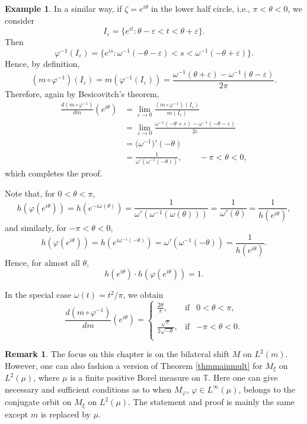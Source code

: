 \documentclass{dis}
\theoremstyle{plain}
\theoremstyle{definition}
\newtheorem{Example}[equation]{Example}
\newtheorem{Remark}[equation]{Remark}
\def\T{\mathbb{T}}
\renewcommand{\phi}{\varphi}
\newcommand{\0}{{\color{lightgray}0}}
\begin{document}
\begin{Example}
In a similar way, if $\zeta = e^{i\theta}$ in the lower half circle, i.e., $\pi<\theta<0$, we consider
\[
I_\varepsilon = \{ e^{it} : \theta-\varepsilon < t < \theta+\varepsilon \}.
\]
Then
\[
\varphi^{-1}(I_\varepsilon) = \{ e^{is} : \omega^{-1}(-\theta-\varepsilon) < s < \omega^{-1}(-\theta+\varepsilon) \}.
\]
Hence, by definition,
\[
(m \circ \varphi^{-1})(I_\varepsilon) = m(\varphi^{-1}(I_\varepsilon)) = \frac{\omega^{-1}(\theta+\varepsilon)-\omega^{-1}(\theta-\varepsilon)}{2\pi}.
\]
Therefore, again by Besicovitch's theorem, 
\begin{align*}
\frac{d(m \circ \varphi^{-1})}{dm}(e^{i\theta}) &= \lim_{\varepsilon \to 0} \frac{(m \circ \varphi^{-1})(I_\varepsilon) }{m(I_\varepsilon)}\\
&= \lim_{\varepsilon \to 0} \frac{\omega^{-1}(-\theta+\varepsilon)-\omega^{-1}(-\theta-\varepsilon)}{2\varepsilon}\\
&= \big(\omega^{-1}\big)'(-\theta)\\
& = \frac{1}{\omega'(\omega^{-1}(-\theta))}, \qquad -\pi < \theta < 0,
\end{align*}
which completes the proof. 

Note that, for $0<\theta<\pi$,
\[
h(\varphi(e^{i\theta})) = h(e^{-i\omega(\theta)}) = \frac{1}{\omega'(\omega^{-1}(\omega(\theta)))} = \frac{1}{\omega'(\theta)} = \frac{1}{h(e^{i\theta})},
\]
and similarly, for $-\pi<\theta<0$,
\[
h(\varphi(e^{i\theta})) = h(e^{i\omega^{-1}(-\theta)}) =  \omega'(\omega^{-1}(-\theta)) = \frac{1}{h(e^{i\theta})}.
\]
Hence, for almost all $\theta$,
\[
h(e^{i\theta}) \cdot h(\varphi(e^{i\theta})) = 1.
\]


In the special case $\omega(t) = t^2/\pi$, we obtain
\[
\frac{d(m \circ \varphi^{-1})}{dm}(e^{i\theta}) =
\left\{
\begin{array}{ccc}
{\displaystyle \frac{2\theta}{\pi}}, & \mbox{if} & 0 < \theta < \pi,\\
%
& & \\
%
{\displaystyle \frac{\sqrt{\pi}}{2\sqrt{-\theta}}}, & \mbox{if} & -\pi < \theta < 0.\\
\end{array} \right.
\]
\end{Example}

\begin{Remark}
The focus on this chapter is on the bilateral shift $M$ on $L^2(m)$. However, one can also fashion a version of Theorem \ref{thmmainmult} for $M_{\xi}$ on $L^2(\mu)$, where $\mu$ is a finite positive Borel measure on $\T$. Here one can give necessary and sufficient conditions as to when $M_{\phi}$, $\phi \in L^{\infty}(\mu)$, belongs to the conjugate orbit on $M_{\xi}$ on $L^2(\mu)$. The statement and proof is mainly the same except $m$ is replaced by $\mu$. 
\end{Remark}
\end{document}
